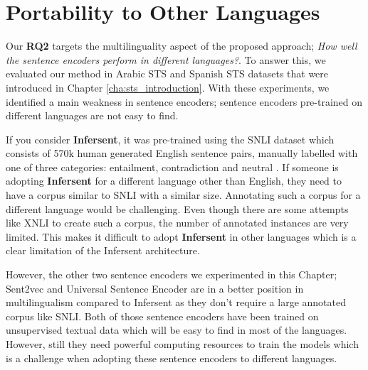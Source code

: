 \section{Portability to Other Languages}
Our \textbf{RQ2} targets the multilinguality aspect of the proposed approach; \textit{How well the sentence encoders perform in different languages?}. To answer this, we evaluated our method in Arabic STS and Spanish STS datasets that were introduced in Chapter \ref{cha:sts_introduction}. With these experiments, we identified a main weakness in sentence encoders; sentence encoders pre-trained on different languages are not easy to find. 

If you consider \textbf{Infersent}, it was pre-trained using the SNLI dataset which consists of 570k human generated English sentence pairs, manually labelled with one of three categories: entailment, contradiction and neutral \cite{bowman-etal-2015-large}. If someone is adopting \textbf{Infersent} for a different language other than English, they need to have a corpus similar to SNLI with a similar size. Annotating such a corpus for a different language would be challenging. Even though there are some attempts like XNLI \cite{conneau-etal-2018-xnli} to create such a corpus, the number of annotated instances are very limited. This makes it difficult to adopt \textbf{Infersent} in other languages which is a clear limitation of the Infersent architecture. 

However, the other two sentence encoders we experimented in this Chapter; Sent2vec and Universal Sentence Encoder are in a better position in multilingualism compared to Infersent as they don't require a large annotated corpus like SNLI. Both of those sentence encoders have been trained on unsupervised textual data which will be easy to find in most of the languages. However, still they need powerful computing resources to train the models which is a challenge when adopting these sentence encoders to different languages. 

